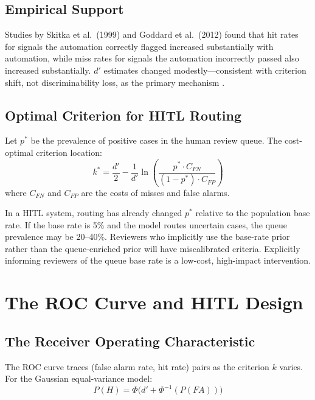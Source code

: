 \subsection{Empirical Support}

Studies by Skitka et al.\ (1999) and Goddard et al.\ (2012) found that hit rates for signals the automation correctly flagged increased substantially with automation, while miss rates for signals the automation incorrectly passed also increased substantially. $d'$ estimates changed modestly---consistent with criterion shift, not discriminability loss, as the primary mechanism \autocite{skitka1999automation, goddard2012automation}.

\subsection{Optimal Criterion for HITL Routing}

Let $p^*$ be the prevalence of positive cases in the human review queue. The cost-optimal criterion location:
\[
k^* = \frac{d'}{2} - \frac{1}{d'} \ln\left(\frac{p^* \cdot C_{FN}}{(1-p^*) \cdot C_{FP}}\right)
\]
where $C_{FN}$ and $C_{FP}$ are the costs of misses and false alarms.

\begin{technote}
In a HITL system, routing has already changed $p^*$ relative to the population base rate. If the base rate is 5\% and the model routes uncertain cases, the queue prevalence may be 20--40\%. Reviewers who implicitly use the base-rate prior rather than the queue-enriched prior will have miscalibrated criteria. Explicitly informing reviewers of the queue base rate is a low-cost, high-impact intervention.
\end{technote}

\section{The ROC Curve and HITL Design}

\subsection{The Receiver Operating Characteristic}

The ROC curve traces (false alarm rate, hit rate) pairs as the criterion $k$ varies. For the Gaussian equal-variance model:
\[
P(H) = \Phi\bigl(d' + \Phi^{-1}(P(FA))\bigr)
\]

